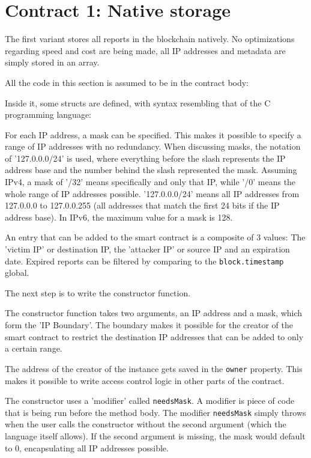 \section{Contract 1: Native storage}
The first variant stores all reports in the blockchain natively. No optimizations regarding speed and cost are being made, all IP addresses and metadata are simply stored in an array.

All the code in this section is assumed to be in the contract body:


Inside it, some structs are defined, with syntax resembling that of the C programming language:



For each IP address, a mask can be specified. This makes it possible to specify a range of IP addresses with no redundancy. 
When discussing masks, the notation of '127.0.0.0/24' is used, where everything before the slash represents the IP address base and the number behind the slash represented the mask. Assuming IPv4, a mask of '/32' means specifically and only that IP, while '/0' means the whole range of IP addresses possible. '127.0.0.0/24' means all IP addresses from 127.0.0.0 to 127.0.0.255 (all addresses that match the first 24 bits if the IP address base). In IPv6, the maximum value for a mask is 128.

An entry that can be added to the smart contract is a composite of 3 values: The 'victim IP' or destination IP, the 'attacker IP' or source IP and an expiration date. Expired reports can be filtered by comparing to the \texttt{block.timestamp} global.

The next step is to write the constructor function.



The constructor function takes two arguments, an IP address and a mask, which form the 'IP Boundary'. The boundary makes it possible for the creator of the smart contract to restrict the destination IP addresses that can be added to only a certain range.

The address of the creator of the instance gets saved in the \texttt{owner} property. This makes it possible to write access control logic in other parts of the contract.

The constructor uses a 'modifier' called \texttt{needsMask}. A modifier is piece of code that is being run before the method body. The modifier \texttt{needsMask} simply throws when the user calls the constructor without the second argument (which the language itself allows). If the second argument is missing, the mask would default to 0, encapsulating all IP addresses possible.

